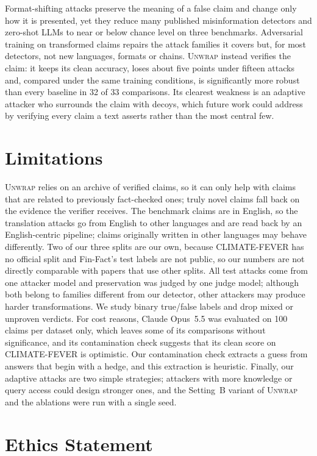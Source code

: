 \documentclass[11pt]{article}
\newcommand{\method}{\textsc{Unwrap}}
\begin{document}
Format-shifting attacks preserve the meaning of a false claim and change only how it is presented, yet they reduce many published misinformation detectors and zero-shot LLMs to near or below chance level on three benchmarks. Adversarial training on transformed claims repairs the attack families it covers but, for most detectors, not new languages, formats or chains. \method{} instead verifies the claim: it keeps its clean accuracy, loses about five points under fifteen attacks and, compared under the same training conditions, is significantly more robust than every baseline in 32 of 33 comparisons. Its clearest weakness is an adaptive attacker who surrounds the claim with decoys, which future work could address by verifying every claim a text asserts rather than the most central few.

\section*{Limitations}

\method{} relies on an archive of verified claims, so it can only help with claims that are related to previously fact-checked ones; truly novel claims fall back on the evidence the verifier receives. The benchmark claims are in English, so the translation attacks go from English to other languages and are read back by an English-centric pipeline; claims originally written in other languages may behave differently. Two of our three splits are our own, because CLIMATE-FEVER has no official split and Fin-Fact's test labels are not public, so our numbers are not directly comparable with papers that use other splits. All test attacks come from one attacker model and preservation was judged by one judge model; although both belong to families different from our detector, other attackers may produce harder transformations. We study binary true/false labels and drop mixed or unproven verdicts. For cost reasons, Claude Opus~5.5 was evaluated on 100 claims per dataset only, which leaves some of its comparisons without significance, and its contamination check suggests that its clean score on CLIMATE-FEVER is optimistic. Our contamination check extracts a guess from answers that begin with a hedge, and this extraction is heuristic. Finally, our adaptive attacks are two simple strategies; attackers with more knowledge or query access could design stronger ones, and the Setting~B variant of \method{} and the ablations were run with a single seed.

\section*{Ethics Statement}
\end{document}
